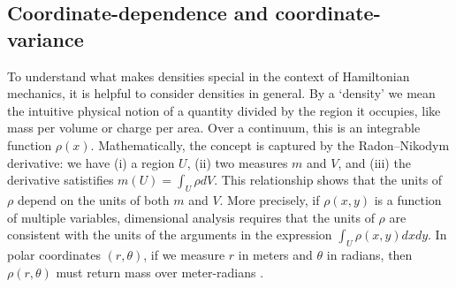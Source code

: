 \documentclass[letterpaper]{article}
\begin{document}
\subsection{Coordinate-dependence and coordinate-variance}
\label{dependence}


To understand what makes densities special in the context of Hamiltonian mechanics, it is helpful to consider densities in general. By a `density' we mean the intuitive physical notion of a quantity divided by the region it occupies, like mass per volume or charge per area. Over a continuum, this is an integrable function $\rho(x)$. Mathematically, the concept is captured by the Radon–Nikodym derivative: we have (i) a region $U$, (ii) two measures $m$ and $V$, and (iii) the derivative satistifies $m(U) = \int_U \rho dV$. This relationship shows that the units of $\rho$ depend on the units of both $m$ and $V$. More precisely, if $\rho(x, y)$ is a function of multiple variables, dimensional analysis requires that the units of $\rho$ are consistent with the units of the arguments in the expression $\int_U \rho(x, y) dx dy$. In polar coordinates $(r, \theta)$, if we measure $r$ in meters and $\theta$ in radians, then $\rho(r, \theta)$ must return mass over meter-radians .
\end{document}
